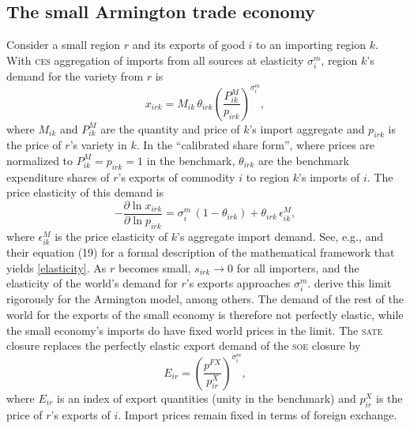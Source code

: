 \documentclass{jgea}
\newcommand{\CES}{\textsc{ces}\xspace}
\newcommand{\SOE}{\textsc{soe}\xspace}
\newcommand{\SATE}{\textsc{sate}\xspace}
\begin{document}
\subsection{The small Armington trade economy}\label{sec:sate}

Consider a small region $r$ and its exports of good $i$ to an importing region $k$.
With \CES aggregation of imports from all sources at elasticity $\sigma^m_i$, region $k$'s demand for the variety from $r$ is
\begin{equation}\label{bilateral}
x_{irk} = M_{ik}\,\theta_{irk}\left(\frac{P^M_{ik}}{p_{irk}}\right)^{\sigma^m_i},
\end{equation}
where $M_{ik}$ and $P^M_{ik}$ are the quantity and price of $k$'s import aggregate and $p_{irk}$ is the price of $r$'s variety in $k$.
In the ``calibrated share form'', where prices are normalized to ${P^M_{ik}}={p_{irk}}=1$ in the benchmark, $\theta_{irk}$ are the benchmark expenditure shares of $r$'s exports of commodity $i$ to region $k$'s imports of $i$.
The price elasticity of this demand is
\begin{equation}\label{elasticity}
-\frac{\partial \ln x_{irk}}{\partial \ln p_{irk}} = \sigma^m_i\,(1-\theta_{irk}) + \theta_{irk}\,\epsilon^M_{ik},
\end{equation}
where $\epsilon^M_{ik}$ is the price elasticity of $k$'s aggregate import demand.
See, e.g., \citet{AtkesonBurstein2008} and their equation (19) for a formal description of the mathematical framework that yields \eqref{elasticity}.
As $r$ becomes small, $s_{irk}\to 0$ for all importers, and the elasticity of the world's demand for $r$'s exports approaches $\sigma^m_i$.
\citet{CaliendoFeenstra2024} derive this limit rigorously for the Armington model, among others.
The demand of the rest of the world for the exports of the small economy is therefore not perfectly elastic, while the small economy's imports do have fixed world prices in the limit.
The \SATE closure replaces the perfectly elastic export demand of the \SOE closure by
\begin{equation}\label{sate}
E_{ir} = \left(\frac{p^{FX}}{p^X_{ir}}\right)^{\sigma^m_i},
\end{equation}
where $E_{ir}$ is an index of export quantities (unity in the benchmark) and $p^X_{ir}$ is the price of $r$'s exports of $i$.
Import prices remain fixed in terms of foreign exchange.
\end{document}
